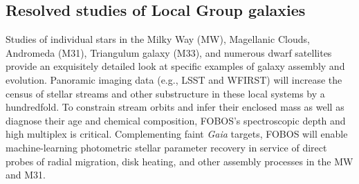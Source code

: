 
\subsection{Resolved studies of Local Group galaxies}
\label{sec:localgroup}

Studies of individual stars in the Milky Way (MW), Magellanic Clouds,
Andromeda (M31), Triangulum galaxy (M33), and numerous dwarf
satellites provide an exquisitely detailed look at specific examples
of galaxy assembly and evolution. Panoramic imaging data (e.g., LSST
and WFIRST) will increase the census of stellar streams and other
substructure in these local systems by a hundredfold. To constrain
stream orbits and infer their enclosed mass
\citep{2017ApJ...836..234S} as well as diagnose their age and
chemical composition, FOBOS's spectroscopic depth and high multiplex
is critical. Complementing faint {\it Gaia} targets, FOBOS will
enable machine-learning photometric stellar parameter recovery
\citep[see Section \ref{sec:datascience};][]{2015ApJ...808...16N,
2018arXiv180401530T, 2018arXiv180803278T} in service of direct probes
of radial migration, disk heating, and other assembly processes in
the MW and M31.





